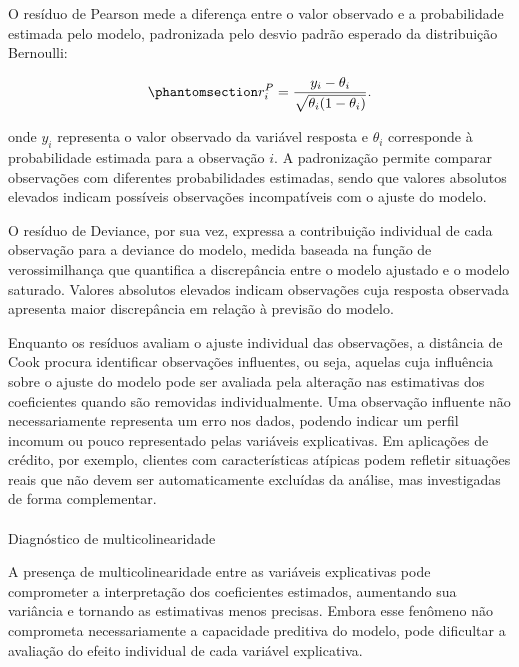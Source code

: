 \documentclass[
  brazilian,
  12pt,
  letterpaper,
  DIV=11,
  numbers=noendperiod]{scrartcl}
\makeatletter
\let\oldparagraph\paragraph
\renewcommand{\paragraph}{
    \@ifstar
      \xxxParagraphStar
      \xxxParagraphNoStar
  }
\newcommand{\xxxParagraphStar}[1]{\oldparagraph*{#1}\mbox{}}
\newcommand{\xxxParagraphNoStar}[1]{\oldparagraph{#1}\mbox{}}
\makeatother
\begin{document}
O resíduo de Pearson mede a diferença entre o valor observado e a
probabilidade estimada pelo modelo, padronizada pelo desvio padrão
esperado da distribuição Bernoulli:

\begin{equation}\protect\phantomsection\label{eq-residuo-pearson}{
r_i^P =
\frac{y_i-\theta_i}
{\sqrt{\theta_i(1-\theta_i)}}.
}\end{equation}

onde \(y_i\) representa o valor observado da variável resposta e
\(\theta_i\) corresponde à probabilidade estimada para a observação
\(i\). A padronização permite comparar observações com diferentes
probabilidades estimadas, sendo que valores absolutos elevados indicam
possíveis observações incompatíveis com o ajuste do modelo.

O resíduo de Deviance, por sua vez, expressa a contribuição individual
de cada observação para a deviance do modelo, medida baseada na função
de verossimilhança que quantifica a discrepância entre o modelo ajustado
e o modelo saturado. Valores absolutos elevados indicam observações cuja
resposta observada apresenta maior discrepância em relação à previsão do
modelo.

Enquanto os resíduos avaliam o ajuste individual das observações, a
distância de Cook procura identificar observações influentes, ou seja,
aquelas cuja influência sobre o ajuste do modelo pode ser avaliada pela
alteração nas estimativas dos coeficientes quando são removidas
individualmente. Uma observação influente não necessariamente representa
um erro nos dados, podendo indicar um perfil incomum ou pouco
representado pelas variáveis explicativas. Em aplicações de crédito, por
exemplo, clientes com características atípicas podem refletir situações
reais que não devem ser automaticamente excluídas da análise, mas
investigadas de forma complementar.

\paragraph{Diagnóstico de
multicolinearidade}\label{diagnuxf3stico-de-multicolinearidade}

A presença de multicolinearidade entre as variáveis explicativas pode
comprometer a interpretação dos coeficientes estimados, aumentando sua
variância e tornando as estimativas menos precisas. Embora esse fenômeno
não comprometa necessariamente a capacidade preditiva do modelo, pode
dificultar a avaliação do efeito individual de cada variável
explicativa.
\end{document}
